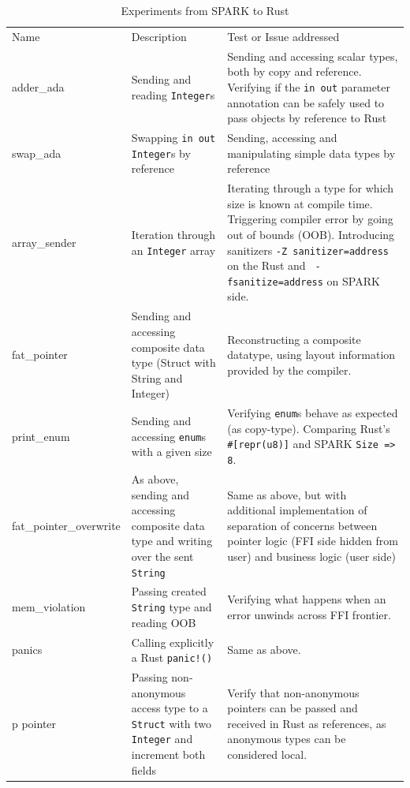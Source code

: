 \documentclass[nomenclature, english, bibtex]{kththesis}
\begin{document}
\begin{table}[ht!]
\footnotesize
\centering
\caption{Experiments from SPARK to Rust}
\label{tab:fromsparktorust}
\begin{tabular}{ |p{3cm}|p{4cm}|p{7cm}| }
\hline
\rowcolor{color1bg_fill}
\multicolumn{3}{|c|}{\centering From SPARK to Rust} \\
\hline
\rowcolor{color1bg_fill}
\centering Name & \centering Description & \centering Test or Issue addressed \tabularnewline
\hline
adder\_ada & Sending and reading \texttt{Integer}s & Sending and accessing scalar types, both by copy and reference. \newline Verifying if the \texttt{in out} parameter annotation can be safely used to pass objects by reference to Rust \tabularnewline
\hline
swap\_ada & Swapping \texttt{in out Integer}s by reference & Sending, accessing and manipulating simple data types by reference \tabularnewline
\hline
array\_sender & Iteration through an \texttt{Integer} array  & Iterating through a type for which size is known at compile time. \newline Triggering compiler error by going out of bounds (OOB). \newline Introducing sanitizers \texttt{-Z sanitizer=address} on the Rust and \texttt{ -fsanitize=address} on SPARK side. \tabularnewline
\hline
fat\_pointer & Sending and accessing composite data type (Struct with String and Integer) & Reconstructing a composite datatype, using layout information provided by the compiler. \tabularnewline
\hline
print\_enum & Sending and accessing \texttt{enum}s with a given size & Verifying \texttt{enum}s behave as expected (as \gls{copy-type}). \newline Comparing Rust's \texttt{\#[repr(u8)]} and SPARK \texttt{Size => 8}. \tabularnewline
\hline
fat\_pointer\_overwrite & As above, sending and accessing composite data type and writing over the sent \texttt{String} & Same as above, but with additional implementation of separation of concerns between pointer logic (FFI side hidden from user) and business logic (user side) \tabularnewline
\hline
mem\_violation & Passing created \texttt{String} type and reading OOB & Verifying what happens when an error unwinds across FFI frontier. \tabularnewline
\hline
panics & Calling explicitly a Rust \texttt{panic!()} & Same as above. \tabularnewline
\hline
p pointer & Passing non-anonymous access type to a \texttt{Struct} with two \texttt{Integer} and increment both fields & Verify that non-anonymous pointers can be passed and received in Rust as references, as anonymous types can be considered local. \tabularnewline
\hline
\end{tabular}
\end{table}
\FloatBarrier
\end{document}
